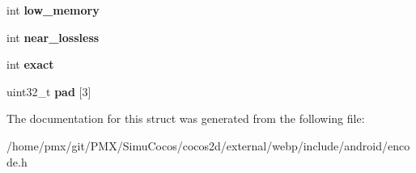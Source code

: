 \begin{DoxyCompactItemize}
\mbox{\label{structWebPConfig_a20c29885747e7b6a7dcbaabcad695449}} 
int {\bfseries low\+\_\+memory}
\item 
\mbox{\label{structWebPConfig_aaa49da995d138314195ed79ed44e0be4}} 
int {\bfseries near\+\_\+lossless}
\item 
\mbox{\label{structWebPConfig_a0f2a9d29de904bedd37c9edd9dec6a34}} 
int {\bfseries exact}
\item 
\mbox{\label{structWebPConfig_a2d17b7825f841795757c8604603d605f}} 
uint32\+\_\+t {\bfseries pad} \mbox{[}3\mbox{]}
\end{DoxyCompactItemize}


The documentation for this struct was generated from the following file\+:\begin{DoxyCompactItemize}
\item 
/home/pmx/git/\+P\+M\+X/\+Simu\+Cocos/cocos2d/external/webp/include/android/encode.\+h\end{DoxyCompactItemize}
